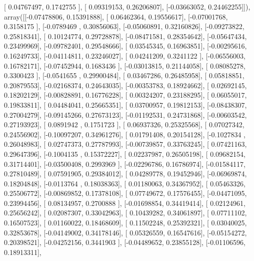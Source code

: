 \documentclass{article}
\begin{document}
       [ 0.04767497,  0.1742755 ],
       [ 0.09319153,  0.26206807],
       [-0.03663052,  0.24462255]]), array([[-0.07478806,  0.15391888],
       [ 0.06462364,  0.19556617],
       [-0.07001768,  0.3158175 ],
       [-0.0789469 ,  0.30856063],
       [-0.05060891,  0.32160826],
       [-0.09273822,  0.25818341],
       [ 0.10124774,  0.29728878],
       [-0.08471581,  0.28354642],
       [-0.05647434,  0.23499969],
       [-0.09782401,  0.29548666],
       [ 0.03545345,  0.16963851],
       [-0.00295616,  0.16249733],
       [-0.04114811,  0.23246027],
       [ 0.04241209,  0.3241122 ],
       [-0.06556003,  0.16782171],
       [-0.07452944,  0.1683436 ],
       [-0.03013815,  0.21144058],
       [ 0.08085278,  0.3300423 ],
       [-0.0541655 ,  0.29900484],
       [ 0.03467286,  0.26485958],
       [ 0.05818851,  0.20879553],
       [-0.02168374,  0.24643035],
       [-0.00353783,  0.18924662],
       [ 0.02692145,  0.18202129],
       [-0.00828891,  0.16776228],
       [ 0.00324207,  0.23188295],
       [ 0.06055017,  0.19833811],
       [ 0.04484041,  0.25665351],
       [ 0.03700957,  0.19812153],
       [-0.08438307,  0.27004279],
       [-0.09145266,  0.27673123],
       [-0.01192531,  0.24731868],
       [-0.00603542,  0.27193923],
       [ 0.0891942 ,  0.1751723 ],
       [ 0.06937326,  0.25325568],
       [ 0.07027342,  0.24556902],
       [-0.10097207,  0.34961276],
       [ 0.01791408,  0.20154128],
       [-0.1027834 ,  0.26048983],
       [ 0.02747373,  0.27787993],
       [-0.00739857,  0.33763245],
       [ 0.07421163,  0.29647396],
       [-0.1004135 ,  0.15372227],
       [ 0.02237987,  0.26505198],
       [ 0.09682154,  0.31714401],
       [-0.03500408,  0.2993969 ],
       [-0.02296786,  0.16786974],
       [-0.01584117,  0.27810489],
       [ 0.07591905,  0.29384012],
       [ 0.04289778,  0.19452946],
       [-0.06969874,  0.18204848],
       [-0.0113764 ,  0.18038363],
       [ 0.01180063,  0.34367952],
       [ 0.05463326,  0.25506772],
       [-0.00869852,  0.17378108],
       [ 0.07749672,  0.17576455],
       [-0.04471095,  0.23994456],
       [ 0.08134957,  0.2700888 ],
       [-0.01698854,  0.34419414],
       [ 0.02124961,  0.25656242],
       [ 0.02087307,  0.33042963],
       [ 0.10439282,  0.34061897],
       [ 0.07711102,  0.16507523],
       [ 0.01160022,  0.18468609],
       [ 0.11502248,  0.25392321],
       [ 0.03040025,  0.32853678],
       [-0.04149002,  0.34178146],
       [ 0.05326559,  0.16547616],
       [-0.05154272,  0.20398521],
       [-0.04252156,  0.3441903 ],
       [-0.04489652,  0.23855128],
       [-0.01106596,  0.18913311],
\end{document}
